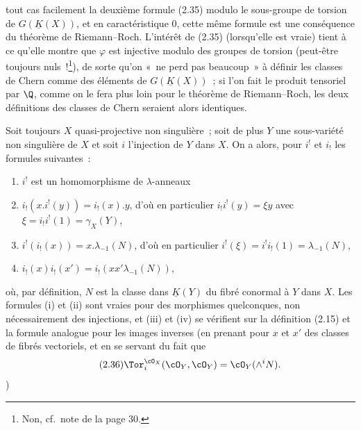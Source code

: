 tout cas facilement la deuxième formule (2.35) modulo le sous-groupe de torsion de $G(\underline K(X))$, et en caractéristique $0$, cette même formule est une conséquence du théorème de Riemann--Roch. L'intérêt de (2.35) (lorsqu'elle est vraie) tient à ce qu'elle montre que $\varphi$ est injective modulo des groupes de torsion (peut-être toujours nuls~!\footnote{Non, cf.\ note de la page 30.}), de sorte qu'on «~ne perd pas beaucoup~» à définir les classes de Chern comme des éléments de $G(\underline K(X))$~; si l'on fait le produit tensoriel par $\Q$, comme on le fera plus loin pour le théorème de Riemann--Roch, les deux définitions des classes de Chern seraient alors identiques.

Soit toujours $X$ quasi-projective non singulière~; soit de plus $Y$ une sous-variété non singulière de $X$ et soit $i$ l'injection de $Y$ dans $X$. On a alors, pour $i^!$ et $i_!$ les formules suivantes~:
\begin{enumerate}[label=(\roman*)]
\item $i^!$ est un homomorphisme de $\lambda$-anneaux
\item $i_!(x.i^!(y))=i_!(x).y$, d'où en particulier $i_!i^!(y)=\xi y$ avec $\xi=i_!i^!(1)=\gamma_X(Y)$,
\item $i^!(i_!(x))=x.\lambda_{-1}(N)$, d'où en particulier $i^!(\xi)=i^!i_!(1)=\lambda_{-1}(N)$,
\item $i_!(x)i_!(x')=i_!(xx'\lambda_{-1}(N))$,
\end{enumerate}
où, par définition, $N$ est la classe dans $\underline K(Y)$ du fibré conormal à $Y$ dans $X$. Les formules (i) et (ii) sont vraies pour des morphismes quelconques, non nécessairement des injections, et (iii) et (iv) se vérifient sur la définition (2.15) et la formule analogue pour les images inverses (en prenant pour $x$ et $x'$ des classes de fibrés vectoriels, et en se servant du fait que
\begin{equation}\tag{2.36}
 \Tor^{\cO_X}_i(\cO_Y,\cO_Y)=\cO_Y(\wedge^i N).
\end{equation}
)
